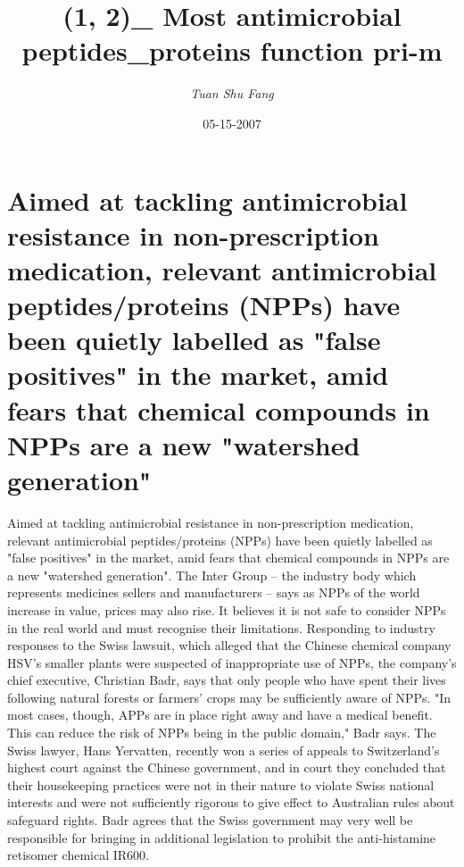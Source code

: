 \documentclass{article}%
\title{(1, 2)\_ Most antimicrobial peptides\_proteins function pri{-}m}%
\author{\textit{Tuan Shu Fang}}%
\date{05-15-2007}%
\begin{document}
%
\normalsize%
\maketitle%
\section{Aimed at tackling antimicrobial resistance in non{-}prescription medication, relevant antimicrobial peptides/proteins (NPPs) have been quietly labelled as "false positives" in the market, amid fears that chemical compounds in NPPs are a new "watershed generation"}%
\label{sec:Aimedattacklingantimicrobialresistanceinnon{-}prescriptionmedication,relevantantimicrobialpeptides/proteins(NPPs)havebeenquietlylabelledasfalsepositivesinthemarket,amidfearsthatchemicalcompoundsinNPPsareanewwatershedgeneration}%
Aimed at tackling antimicrobial resistance in non{-}prescription medication, relevant antimicrobial peptides/proteins (NPPs) have been quietly labelled as "false positives" in the market, amid fears that chemical compounds in NPPs are a new "watershed generation".\newline%
The Inter Group – the industry body which represents medicines sellers and manufacturers – says as NPPs of the world increase in value, prices may also rise. It believes it is not safe to consider NPPs in the real world and must recognise their limitations.\newline%
Responding to industry responses to the Swiss lawsuit, which alleged that the Chinese chemical company HSV’s smaller plants were suspected of inappropriate use of NPPs, the company’s chief executive, Christian Badr, says that only people who have spent their lives following natural forests or farmers' crops may be sufficiently aware of NPPs.\newline%
"In most cases, though, APPs are in place right away and have a medical benefit. This can reduce the risk of NPPs being in the public domain," Badr says.\newline%
The Swiss lawyer, Hans Yervatten, recently won a series of appeals to Switzerland's highest court against the Chinese government, and in court they concluded that their housekeeping practices were not in their nature to violate Swiss national interests and were not sufficiently rigorous to give effect to Australian rules about safeguard rights.\newline%
Badr agrees that the Swiss government may very well be responsible for bringing in additional legislation to prohibit the anti{-}histamine retisomer chemical IR600.\newline%
\end{document}
